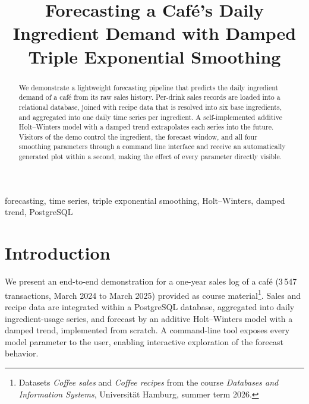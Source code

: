 \documentclass[conference]{IEEEtran}
\begin{document}
\title{Forecasting a Caf\'e's Daily Ingredient Demand with Damped Triple Exponential Smoothing}

\author{
\and
{}
\and
{}
}

\maketitle

\begin{abstract}
We demonstrate a lightweight forecasting pipeline that predicts the daily ingredient
demand of a caf\'e from its raw sales history. Per-drink sales records are loaded into
a relational database, joined with recipe data that is resolved into six base
ingredients, and aggregated into one daily time series per ingredient. A
self-implemented additive Holt--Winters model with a damped trend extrapolates each
series into the future. Visitors of the demo control the ingredient, the forecast window, and all four smoothing parameters through a command line interface and receive an automatically generated plot within a second, making the effect of every parameter directly visible.

\end{abstract}

\begin{IEEEkeywords}
forecasting, time series, triple exponential smoothing, Holt--Winters, damped trend, PostgreSQL
\end{IEEEkeywords}

\section{Introduction}
We present an end-to-end demonstration for a one-year sales log of a caf\'e
(3\,547 transactions, March 2024 to March 2025) provided as course
material\footnote{Datasets \emph{Coffee sales} and \emph{Coffee recipes} from the
course \emph{Databases and Information Systems}, Universit\"at Hamburg, summer term
2026.}. Sales and recipe data are integrated within a PostgreSQL database, aggregated
into daily ingredient-usage series, and forecast by an additive Holt--Winters model with
a damped trend, implemented from scratch. A command-line tool exposes every model
parameter to the user, enabling interactive exploration of the forecast behavior.
\end{document}
